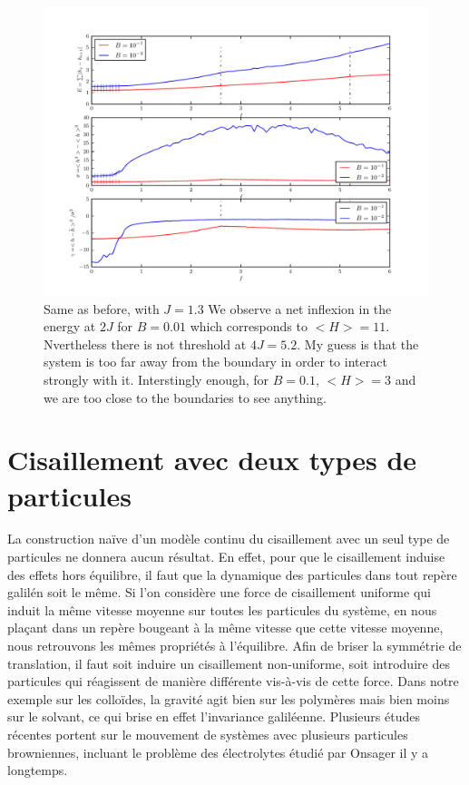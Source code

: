 \begin{figure}
	\includegraphics[width=\linewidth]{./sosequi-laser/j13.pdf}
	\caption{Same as before, with $J=1.3$ We observe a net inflexion in the energy at $2 J$ for  $B=0.01$ which corresponds to $<H>=11$. Nvertheless there is not threshold at $4 J = 5.2$. My guess is that the system is too far away from the boundary in order to interact strongly with it. Interstingly enough, for $B=0.1$, $<H>=3$ and we are too close to the boundaries to see anything.}
\end{figure}


\section{Cisaillement avec deux types de particules}

La construction naïve d'un modèle continu du cisaillement avec un seul type de particules ne donnera aucun résultat. En effet, pour que le cisaillement induise des effets hors équilibre, il faut que la dynamique des particules dans tout repère galilén soit le même. Si l'on considère une force de cisaillement uniforme qui induit la même vitesse moyenne sur toutes les particules du système, en nous plaçant dans un repère bougeant à la même vitesse que cette vitesse moyenne, nous retrouvons les mêmes propriétés à l'équilibre.
Afin de briser la symmétrie de translation, il faut soit induire un cisaillement non-uniforme, soit introduire des particules qui réagissent de manière différente vis-à-vis de cette force. Dans notre exemple sur les colloïdes, la gravité agit bien sur les polymères mais bien moins sur le solvant, ce qui brise en effet l'invariance galiléenne. 
Plusieurs études récentes portent sur le mouvement de systèmes avec plusieurs particules browniennes, incluant le problème des électrolytes étudié par Onsager \cite{onsager} il y a longtemps.

